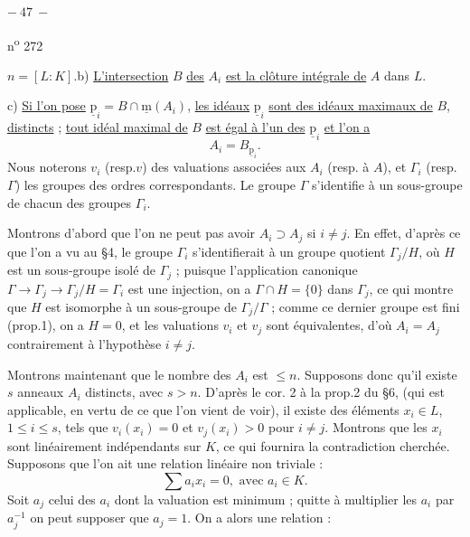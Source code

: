 
\begin{center}$-\ 47\ -$\end{center}\hfill n\textsuperscript{o} 272

$n=[L:K]$.\quad b) \uline{L'intersection} $B$ \uline{des} $A_i$ \uline{est la clôture intégrale de} $A$ dans $L$.

c) \uline{Si l'on pose} $\underline{\mathrm p}_i=B\cap\underline{\mathrm m}(A_i)$, \uline{les idéaux} $\underline{\mathrm p}_i$ \uline{sont des idéaux maximaux de} $B$, \uline{distincts} ; \uline{tout idéal maximal de} $B$ \uline{est égal à l'un des} $\underline{\mathrm p}_i$ \uline{et l'on a}
\[
A_i=B_{\underline{\mathrm p}_i}.
\]
Nous noterons $v_i$ (resp.$v$) des valuations associées aux $A_i$ (resp. à $A$), et $\Gamma_i$ (resp.$\Gamma$) les groupes des ordres correspondants. Le groupe $\Gamma$ s'identifie à un sous-groupe de chacun des groupes $\Gamma_i$.

Montrons d'abord que l'on ne peut pas avoir $A_i\supset A_j$ si $i\ne j$. En effet, d'après ce que l'on a vu au \S4, le groupe $\Gamma_i$ s'identifierait à un groupe quotient $\Gamma_j/H$, où $H$ est un sous-groupe isolé de $\Gamma_j$ ; puisque l'application canonique $\Gamma\longrightarrow\Gamma_j\longrightarrow\Gamma_j/H=\Gamma_i$ est une injection, on a $\Gamma\cap H=\{0\}$ dans $\Gamma_j$, ce qui montre que $H$ est isomorphe à un sous-groupe de $\Gamma_j/\Gamma$ ; comme ce dernier groupe est fini (prop.1), on a $H=0$, et les valuations $v_i$ et $v_j$ sont équivalentes, d'où $A_i=A_j$ contrairement à l'hypothèse $i\ne j$.

Montrons maintenant que le nombre des $A_i$ est  $\leqslant n$. Supposons donc qu'il existe $s$ anneaux $A_i$ distincts, avec $s>n$. D'après le cor. 2 à la prop.2 du \S6, (qui est applicable, en vertu de ce que l'on vient de voir), il existe des éléments $x_i\in L$, $1\leqslant i\leqslant s$, tels que $v_i(x_i)=0$ et $v_j(x_i)>0$ pour $i\ne j$. Montrons que les $x_i$ sont linéairement indépendants sur $K$, ce qui fournira la contradiction cherchée. Supposons que l'on ait une relation linéaire non triviale :
\[
\sum a_ix_i=0,\text{ avec }a_i\in K.
\]
Soit $a_j$ celui des $a_i$ dont la valuation est minimum ; quitte à multiplier les $a_i$ par $a_j^{-1}$ on peut supposer que $a_j=1$. On a alors une relation :
